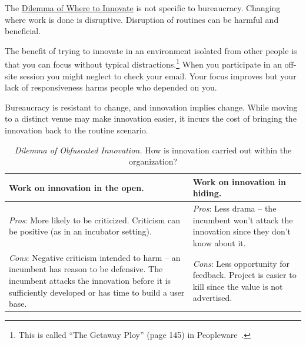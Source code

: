 The \hyperref[table:dilemma-personal-where-to-innovate]{Dilemma of Where to Innovate} is not specific to bureaucracy. Changing where work is done is disruptive. Disruption of routines can be harmful and beneficial.

The benefit of trying to innovate in an
environment isolated from other people is that you can focus without typical distractions.\footnote{This is called ``The Getaway Ploy'' (page 145) in Peopleware~\cite{1987_DeMarco}.} When you participate in an off-site session you might neglect to check your email. Your focus improves but your lack of responsiveness harms people who depended on you.

Bureaucracy is resistant to change, and innovation implies change. While moving to a distinct venue may make innovation easier, it incurs the cost of bringing the innovation back to the routine scenario.

\begin{center}
\begin{table}[H] %
\begin{tabular}{ | m{\dilemmatablewidth}| m{\dilemmatablewidth} | } 
  \hline
  \textbf{Work on innovation in the open.} &
  \textbf{Work on innovation in hiding.} \\
  \hline
  \textit{Pros}: More likely to be criticized. Criticism can be positive (as in an incubator setting).& 
  \textit{Pros}: Less drama -- the incumbent won't attack the innovation since they don't know about it. \\
  \hline
  \textit{Cons}: Negative criticism intended to harm -- an incumbent has reason to be defensive. The incumbent attacks the innovation before it is sufficiently developed or has time to build a user base. & 
  \textit{Cons}: Less opportunity for feedback. Project is easier to kill since the value is not advertised.\\
  \hline
\end{tabular}
\caption{
\textit{Dilemma of Obfuscated Innovation.}
How is innovation carried out within the organization?
}
\label{table:dilemma-personal-innovate-open-obscure}
\end{table}
\end{center}

